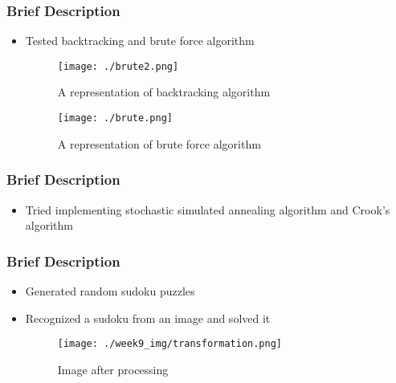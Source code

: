 \documentclass{beamer}
\begin{document}
\begin{frame}
     \frametitle{Brief Description}   
     \begin{itemize}
		  \item Tested backtracking and brute force algorithm
               \vspace{4mm}
               \begin{figure}
                    \texttt{[image: ./brute2.png]}                  
                    \caption{A representation of backtracking algorithm}
                    \centering
                    \end{figure}   
               \begin{figure}                    
                    \texttt{[image: ./brute.png]}
                    \caption{A representation of brute force algorithm}
                    \centering
                    \end{figure}        
	 \end{itemize}
\end{frame}

\begin{frame}
     \frametitle{Brief Description}   
     \begin{itemize}
          \item Tried implementing stochastic simulated annealing algorithm and Crook's algorithm
               \begin{figure}%
                    \centering
                    \qquad
                    \label{fig:example}%
                \end{figure}
	 \end{itemize}
\end{frame}

\begin{frame}
     \frametitle{Brief Description}   
     \begin{itemize}
		  \item Generated random sudoku puzzles
		  \item Recognized a sudoku from an image and solved it
		  \begin{figure}
               \texttt{[image: ./week9\_img/transformation.png]}
               \caption{Image after processing}
               \end{figure}
	 \end{itemize}
\end{frame}
\end{document}
